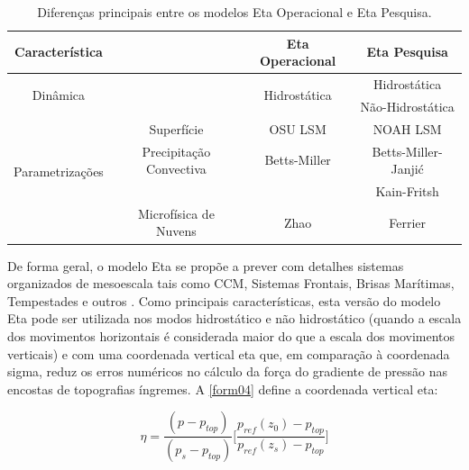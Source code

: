 \begin{table}[!hbp]
\caption{Diferenças principais entre os modelos Eta Operacional e Eta Pesquisa.}
\label{tab02}
\centering
\begin{tabular}{c|c|c|c}
\hline
Característica                       &                         & Eta Operacional              & Eta Pesquisa          \\
\hline
\multirow{2}{2.8cm}{Dinâmica}        &                         & \multirow{2}{2.8cm}{Hidrostática}      & Hidrostática       \\
                                     &                         &                   & Não-Hidrostática   \\
\hline
                                     & Superfície              & OSU LSM\footnotemark[1]          & NOAH LSM\footnotemark[2]          \\ 
\multirow{2}{2.8cm}{Parametrizações} & Precipitação Convectiva & Betts-Miller      & Betts-Miller-Janjić\\
                                     &                         &                   & Kain-Fritsh        \\
                                     & Microfísica de Nuvens   & Zhao              & Ferrier            \\
\hline
\end{tabular}
\end{table}


De forma geral, o modelo Eta se propõe a prever com detalhes sistemas organizados de mesoescala tais como CCM, Sistemas Frontais, Brisas Marítimas, Tempestades e outros \cite{chou96}. Como principais características, esta versão do modelo Eta pode ser utilizada nos modos hidrostático e não hidrostático (quando a escala dos movimentos horizontais é considerada maior do que a escala dos movimentos verticais) e com uma coordenada vertical eta que, em comparação à coordenada sigma, reduz os erros numéricos no cálculo da força do gradiente de pressão nas encostas de topografias íngremes. A \autoref{form04} define a coordenada vertical eta:

\begin{equation}
\eta=\frac{(p-p_{top})}{(p_{s}-p_{top})}\bigg[\frac{p_{ref}(z_{0})-p_{top}}{p_{ref}(z_{s})-p_{top}}\bigg]
\label{form04}
\end{equation}

